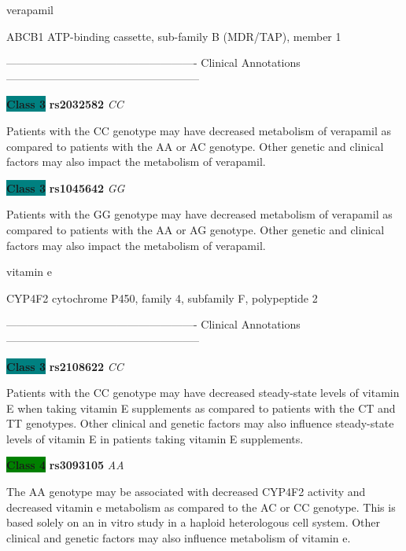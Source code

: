\documentclass{resume} %
\begin{document}
\begin{rSection}{ verapamil }
\begin{rSubsection}{ ABCB1 }{ ATP-binding cassette, sub-family B (MDR/TAP), member 1 }{}{}
\item[]

\item[] ---------------------------------------------------- Clinical Annotations -----------------------------------------------------\newline
\item \textbf{\colorbox{teal} {Class 3}} \textbf{ rs2032582 } \textit{ CC }
\item[] Patients with the CC genotype may have decreased metabolism of verapamil as compared to patients with the AA or AC genotype. Other genetic and clinical factors may also impact the metabolism of verapamil.\item \textbf{\colorbox{teal} {Class 3}} \textbf{ rs1045642 } \textit{ GG }
\item[] Patients with the GG genotype may have decreased metabolism of verapamil as compared to patients with the AA or AG genotype. Other genetic and clinical factors may also impact the metabolism of verapamil.
\end{rSubsection}

\end{rSection}\begin{rSection}{ vitamin e }
\item[]

\begin{rSubsection}{ CYP4F2 }{ cytochrome P450, family 4, subfamily F, polypeptide 2 }{}{}
\item[]

\item[] ---------------------------------------------------- Clinical Annotations -----------------------------------------------------\newline
\item \textbf{\colorbox{teal} {Class 3}} \textbf{ rs2108622 } \textit{ CC }
\item[] Patients with the CC genotype may have decreased steady-state levels of vitamin E when taking vitamin E supplements as compared to patients with the CT and TT genotypes. Other clinical and genetic factors may also influence steady-state levels of vitamin E in patients taking vitamin E supplements.\item \textbf{\colorbox{green} {Class 4}} \textbf{ rs3093105 } \textit{ AA }
\item[] The AA genotype may be associated with decreased CYP4F2 activity and decreased vitamin e metabolism as compared to the AC or CC genotype. This is based solely on an in vitro study in a haploid heterologous cell system. Other clinical and genetic factors may also influence metabolism of vitamin e.
\end{rSubsection}


\end{rSection}
\end{document}
